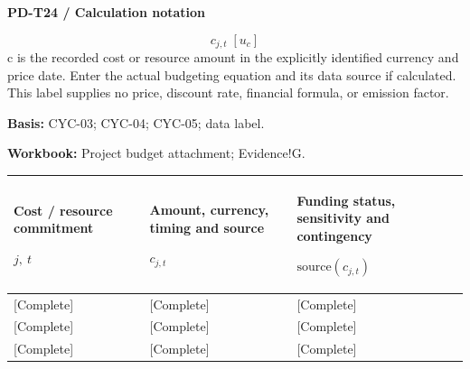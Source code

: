 \par\begingroup\sffamily\fontsize{8}{10}\selectfont\color{NEBGreen}\setlength{\parskip}{2pt}\setlength{\abovedisplayskip}{4pt}\setlength{\belowdisplayskip}{4pt}\setlength{\abovedisplayshortskip}{2pt}\setlength{\belowdisplayshortskip}{3pt}
\textbf{PD-T24 / Calculation notation}\par
{\fontsize{9}{11}\selectfont\[ c_{j,t}\;[u_c] \]}
c is the recorded cost or resource amount in the explicitly identified currency and price date. Enter the actual budgeting equation and its data source if calculated. This label supplies no price, discount rate, financial formula, or emission factor.\par
\textbf{Basis:} CYC-03; CYC-04; CYC-05; data label.\par
\textbf{Workbook:} Project budget attachment; Evidence!G.\par\endgroup
{\sffamily\fontsize{8.3}{10.3}\selectfont\begin{longtable}{@{}P{51.14mm} P{57.74mm} P{56.09mm}@{}}
\toprule
\textbf{Cost / resource commitment}\par {\normalfont\fontsize{8.2}{10}\selectfont $j,\ t$} & \textbf{Amount, currency, timing and source}\par {\normalfont\fontsize{8.2}{10}\selectfont $c_{j,t}$} & \textbf{Funding status, sensitivity and contingency}\par {\normalfont\fontsize{8.2}{10}\selectfont $\text{source}(c_{j,t})$}\\\midrule\endhead
\rule{0pt}{7.7mm}[Complete] & [Complete] & [Complete]\\\hline
\rule{0pt}{7.7mm}[Complete] & [Complete] & [Complete]\\\hline
\rule{0pt}{7.7mm}[Complete] & [Complete] & [Complete]\\\hline
\end{longtable}}
\par\begingroup\sffamily\fontsize{8}{10}\selectfont\color{NEBGreen}\setlength{\parskip}{2pt}\setlength{\abovedisplayskip}{4pt}\setlength{\belowdisplayskip}{4pt}\setlength{\abovedisplayshortskip}{2pt}\setlength{\belowdisplayshortskip}{3pt}
